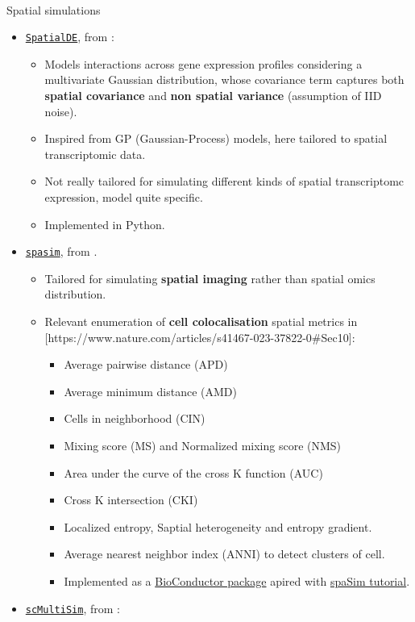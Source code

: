 \documentclass[
  letterpaper,
]{book}
\makeatletter
\let\oldparagraph\paragraph
\renewcommand{\paragraph}{
    \@ifstar
      \xxxParagraphStar
      \xxxParagraphNoStar
  }
\newcommand{\xxxParagraphStar}[1]{\oldparagraph*{#1}\mbox{}}
\newcommand{\xxxParagraphNoStar}[1]{\oldparagraph{#1}\mbox{}}
\providecommand{\tightlist}{%
  \setlength{\itemsep}{0pt}\setlength{\parskip}{0pt}}\usepackage{longtable,booktabs,array}
\makeatother
\begin{document}
\paragraph{Spatial simulations}\label{spatial-simulations}

\begin{itemize}
\tightlist
\item
  \href{https://github.com/Teichlab/SpatialDE}{\texttt{SpatialDE}}, from
  \autocite{svensson2018nm}:

  \begin{itemize}
  \tightlist
  \item
    Models interactions across gene expression profiles considering a
    multivariate Gaussian distribution, whose covariance term captures
    both \textbf{spatial covariance} and \textbf{non spatial variance}
    (assumption of IID noise).
  \item
    Inspired from GP (Gaussian-Process) models, here tailored to spatial
    transcriptomic data.
  \item
    Not really tailored for simulating different kinds of spatial
    transcriptomc expression, model quite specific.
  \item
    Implemented in Python.
  \end{itemize}
\item
  \href{https://www.nature.com/articles/s41467-023-37822-0}{\texttt{spasim}},
  from \textcite{feng2023nc}.

  \begin{itemize}
  \tightlist
  \item
    Tailored for simulating \textbf{spatial imaging} rather than spatial
    omics distribution.
  \item
    Relevant enumeration of \textbf{cell colocalisation} spatial metrics
    in {[}https://www.nature.com/articles/s41467-023-37822-0\#Sec10{]}:

    \begin{itemize}
    \tightlist
    \item
      Average pairwise distance (APD)
    \item
      Average minimum distance (AMD)
    \item
      Cells in neighborhood (CIN)
    \item
      Mixing score (MS) and Normalized mixing score (NMS)
    \item
      Area under the curve of the cross K function (AUC)
    \item
      Cross K intersection (CKI)
    \item
      Localized entropy, Saptial heterogeneity and entropy gradient.
    \item
      Average nearest neighbor index (ANNI) to detect clusters of cell.
    \item
      Implemented as a
      \href{https://bioconductor.org/packages/spaSim/}{BioConductor
      package} apired with
      \href{https://trigosteam.github.io/spaSim/}{spaSim tutorial}.
    \end{itemize}
  \end{itemize}
\item
  \href{https://github.com/ZhangLabGT/scMultiSim}{\texttt{scMultiSim}},
  from \textcite{li2023rs}:


\end{itemize}
\end{document}
